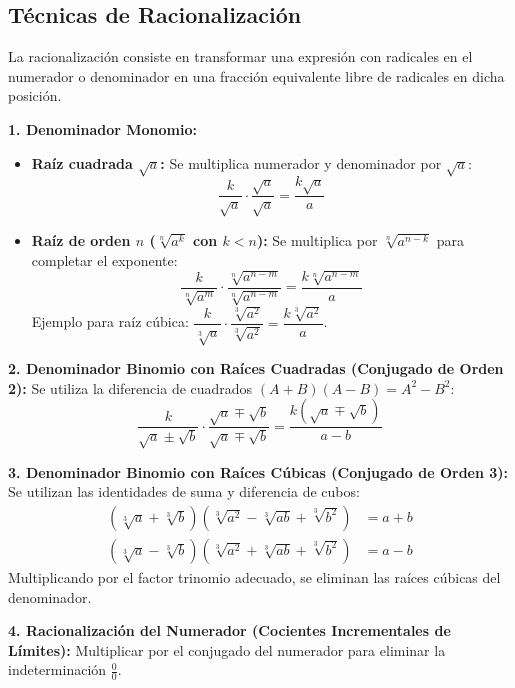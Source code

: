 \documentclass[12pt, letterpaper]{article}
\begin{document}
\subsection{Técnicas de Racionalización}

La racionalización consiste en transformar una expresión con radicales en el numerador o denominador en una fracción equivalente libre de radicales en dicha posición.

\begin{cuadropasos}
      \textbf{1. Denominador Monomio:}
      \begin{itemize}[leftmargin=*]
            \item \textbf{Raíz cuadrada $\sqrt{a}$:} Se multiplica numerador y denominador por $\sqrt{a}$:
                  $$\frac{k}{\sqrt{a}} \cdot \frac{\sqrt{a}}{\sqrt{a}} = \frac{k\sqrt{a}}{a}$$
            \item \textbf{Raíz de orden $n$ ($\sqrt[n]{a^k}$ con $k < n$):} Se multiplica por $\sqrt[n]{a^{n-k}}$ para completar el exponente:
                  $$\frac{k}{\sqrt[n]{a^m}} \cdot \frac{\sqrt[n]{a^{n-m}}}{\sqrt[n]{a^{n-m}}} = \frac{k\sqrt[n]{a^{n-m}}}{a}$$
                  Ejemplo para raíz cúbica: $\dfrac{k}{\sqrt[3]{a}} \cdot \dfrac{\sqrt[3]{a^2}}{\sqrt[3]{a^2}} = \dfrac{k\sqrt[3]{a^2}}{a}$.
      \end{itemize}

      \textbf{2. Denominador Binomio con Raíces Cuadradas (Conjugado de Orden 2):}
      Se utiliza la diferencia de cuadrados $(A + B)(A - B) = A^2 - B^2$:
      $$\frac{k}{\sqrt{a} \pm \sqrt{b}} \cdot \frac{\sqrt{a} \mp \sqrt{b}}{\sqrt{a} \mp \sqrt{b}} = \frac{k(\sqrt{a} \mp \sqrt{b})}{a - b}$$

      \textbf{3. Denominador Binomio con Raíces Cúbicas (Conjugado de Orden 3):}
      Se utilizan las identidades de suma y diferencia de cubos:
      \begin{align*}
            (\sqrt[3]{a} + \sqrt[3]{b})(\sqrt[3]{a^2} - \sqrt[3]{ab} + \sqrt[3]{b^2}) & = a + b \\
            (\sqrt[3]{a} - \sqrt[3]{b})(\sqrt[3]{a^2} + \sqrt[3]{ab} + \sqrt[3]{b^2}) & = a - b
      \end{align*}
      Multiplicando por el factor trinomio adecuado, se eliminan las raíces cúbicas del denominador.

      \textbf{4. Racionalización del Numerador (Cocientes Incrementales de Límites):}
      Multiplicar por el conjugado del numerador para eliminar la indeterminación $\frac{0}{0}$.
\end{cuadropasos}
\end{document}
